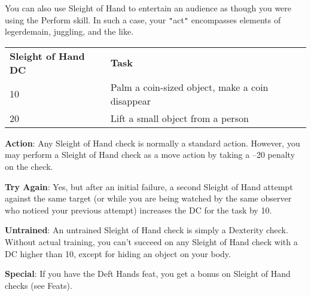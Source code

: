 You can also use Sleight of Hand to entertain an audience as though you were using the Perform skill. In such a case, your \texttt{{}"{}}act\texttt{{}"{}} encompasses elements of legerdemain, juggling, and the like.
\begin{table}
 \sffamily
 \begin{tabular}{ll}
\textbf{Sleight of Hand DC} & \textbf{Task}\\
10 & Palm a coin-sized object, make a coin disappear\\
20 & Lift a small object from a person\\  
 \end{tabular}

\end{table}
				
\textbf{Action}: Any Sleight of Hand check is normally a standard action. However, you may perform a Sleight of Hand check as a move action by taking a --20 penalty on the check.
				
\textbf{Try Again}: Yes, but after an initial failure, a second Sleight of Hand attempt against the same target (or while you are being watched by the same observer who noticed your previous attempt) increases the DC for the task by 10.
				
\textbf{Untrained}: An untrained Sleight of Hand check is simply a Dexterity check. Without actual training, you can't succeed on any Sleight of Hand check with a DC higher than 10, except for hiding an object on your body.
				
\textbf{Special}: If you have the Deft Hands feat, you get a bonus on Sleight of Hand checks (see Feats).
        	
